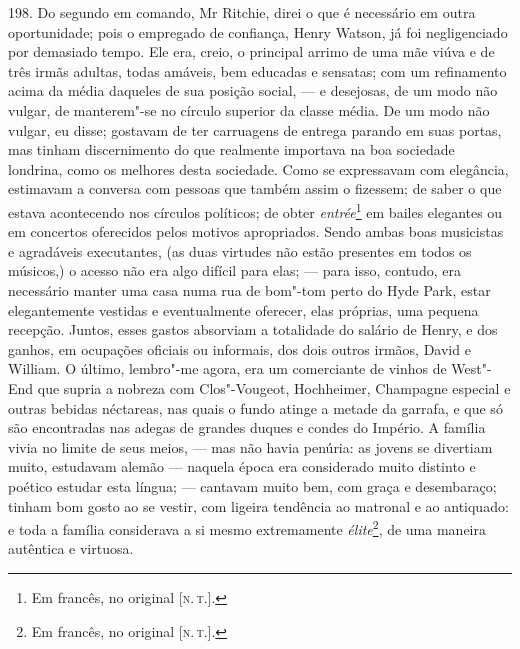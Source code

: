 198. Do segundo em comando, Mr Ritchie, direi o que é necessário em
outra oportunidade; pois o empregado de confiança, Henry Watson, já foi
negligenciado por demasiado tempo. Ele era, creio, o principal arrimo de
uma mãe viúva e de três irmãs adultas, todas amáveis, bem educadas e
sensatas; com um refinamento acima da média daqueles de sua posição
social, --- e desejosas, de um modo não vulgar, de manterem"-se no círculo
superior da classe média. De um modo não vulgar, eu disse; gostavam de
ter carruagens de entrega parando em suas portas, mas tinham
discernimento do que realmente importava na boa sociedade londrina, como
os melhores desta sociedade. Como se expressavam com elegância,
estimavam a conversa com pessoas que também assim o fizessem; de saber o
que estava acontecendo nos círculos políticos; de obter
\emph{entrée}\footnote{Em francês, no original {[}\textsc{n.\,t.}{]}.} em bailes
elegantes ou em concertos oferecidos pelos motivos apropriados. Sendo
ambas boas musicistas e agradáveis executantes, (as duas virtudes não
estão presentes em todos os músicos,) o acesso não era algo difícil para
elas; --- para isso, contudo, era necessário manter uma casa numa rua de
bom"-tom perto do Hyde Park, estar elegantemente vestidas e eventualmente
oferecer, elas próprias, uma pequena recepção. Juntos, esses gastos
absorviam a totalidade do salário de Henry, e dos ganhos, em ocupações
oficiais ou informais, dos dois outros irmãos, David e William. O
último, lembro"-me agora, era um comerciante de vinhos de West"-End que
supria a nobreza com Clos"-Vougeot, Hochheimer, Champagne especial e
outras bebidas néctareas, nas quais o fundo atinge a metade da garrafa,
e que só são encontradas nas adegas de grandes duques e condes do
Império. A família vivia no limite de seus meios, --- mas não havia
penúria: as jovens se divertiam muito, estudavam alemão --- naquela época
era considerado muito distinto e poético estudar esta língua; ---
cantavam muito bem, com graça e desembaraço; tinham bom gosto ao se
vestir, com ligeira tendência ao matronal e ao antiquado: e toda a
família considerava a si mesmo extremamente \emph{élite}\footnote{Em
  francês, no original {[}\textsc{n.\,t.}{]}.}, de uma maneira autêntica e
virtuosa.

